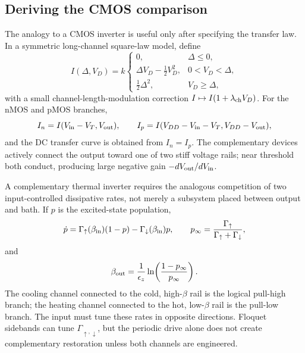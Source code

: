 \documentclass[11pt,a4paper]{article}
\theoremstyle{plain}
\theoremstyle{definition}
\theoremstyle{remark}
\begin{document}
\subsection{Deriving the CMOS comparison}
The analogy to a CMOS inverter is useful only after specifying the
transfer law.  In a symmetric long-channel square-law model, define
\begin{equation}
 I(\Delta,V_D)=k
 \begin{cases}
 0,&\Delta\le0,\\
 \Delta V_D-\tfrac12V_D^2,&0<V_D<\Delta,\\
 \tfrac12\Delta^2,&V_D\ge\Delta,
 \end{cases}
 \label{eq:mos-square-law}
\end{equation}
with a small channel-length-modulation correction
$I\mapsto I(1+\lambda_{\rm ch}V_D)$.  For the nMOS and pMOS branches,
\begin{equation}
 I_n=I(V_{\rm in}-V_T,V_{\rm out}),\qquad
 I_p=I(V_{DD}-V_{\rm in}-V_T,V_{DD}-V_{\rm out}),
 \label{eq:cmos-branch-currents}
\end{equation}
and the DC transfer curve is obtained from $I_n=I_p$.  The complementary
devices actively connect the output toward one of two stiff voltage rails;
near threshold both conduct, producing large negative gain
$-d V_{\rm out}/d V_{\rm in}$.

A complementary thermal inverter requires the analogous competition of
two input-controlled dissipative rates, not merely a subsystem placed
between output and bath.  If $p$ is the excited-state population,
\begin{equation}
 \dot p
 =\Gamma_\uparrow(\beta_{\rm in})(1-p)
 -\Gamma_\downarrow(\beta_{\rm in})p,
 \qquad
 p_\infty
 =\frac{\Gamma_\uparrow}
 {\Gamma_\uparrow+\Gamma_\downarrow},
 \label{eq:complementary-thermal-rates}
\end{equation}
and
\begin{equation}
 \beta_{\rm out}
 =\frac{1}{\epsilon_z}\ln\!\left(\frac{1-p_\infty}{p_\infty}\right).
 \label{eq:thermal-inverter-output}
\end{equation}
The cooling channel connected to the cold, high-$\beta$ rail is the
logical pull-high branch; the heating channel connected to the hot,
low-$\beta$ rail is the pull-low branch.  The input must tune these rates
in opposite directions.  Floquet sidebands can tune
$\Gamma_{\uparrow,\downarrow}$, but the periodic drive alone does not
create complementary restoration unless both channels are engineered.
\end{document}
